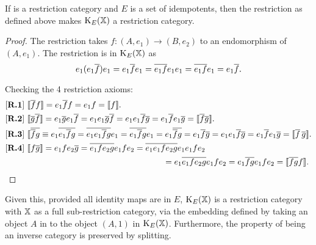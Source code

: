 \begin{proposition}\label{prop:spleisarestrictioncat}
  If \X is a restriction category and $E$ is a set of idempotents, then
  the restriction as defined above makes $\text{K}_{E}(\mathbb{X})$ a restriction category.
\end{proposition}
\begin{proof}
  The restriction takes $f:(A,e_1)\to (B,e_2)$ to an endomorphism of $(A,e_1)$. The restriction
  is in $\text{K}_{E}(\mathbb{X})$ as
  \[
    e_1 (e_1\overline{f}) e_1 = e_1 \overline{f} e_1
    = \overline{e_1 f} e_1 e_1
    = \overline{e_1 f} e_1
    = e_1 \overline{ f}.
  \]

  Checking the 4 restriction axioms:
  \begin{align*}
    &[\text{{\bfseries R.1}}]\  \llbracket\overline{f}f\rrbracket = e_1 \overline{f} f
    = e_1 f = \llbracket f\rrbracket.\\
    & [\text{{\textbf{R.2}}}]\ \llbracket\overline{g}\overline{f}\rrbracket =
    e_1\overline{g}  e_1\overline{f}
    = e_1 e_1\overline{g}  \overline{f} = e_1 e_1\overline{f}  \overline{g}
    = e_1\overline{f}  e_1\overline{g}  = \llbracket\overline{f}\overline{g}\rrbracket.\\
    & [\text{{\textbf{R.3}}}]\ \llbracket\overline{\overline{f} g } \equiv
    e_1 \overline{e_1 \overline{f}  g}
    =  \overline{e_1 e_1 \overline{f} g} e_1
    =  \overline{e_1 \overline{f} g} e_1
    =  e_1 \overline{\overline{f} g}
    = e_1 \overline{f}\overline{g}
    = e_{1}e_{1}\overline{f}\overline{g}
    = e_1 \overline{f}e_1\overline{g}
    = \llbracket\overline{f}\, \overline{g}\rrbracket.\\
    &[\text{{\textbf{R.4}}}]\  \llbracket f \overline{g} \rrbracket =
     e_1f e_2 \overline{g}
    = \overline{e_1 f e_2 g} e_1 f e_2
    = \overline{e_1 e_1 f e_2 g} e_1 e_1 f e_2 \\
    & \qquad \qquad \qquad \qquad \qquad \qquad \qquad \qquad \qquad \quad
    = e_1 \overline{ e_1 f e_2 g} e_1 f e_2
    = e_1 \overline{f g} e_1 f e_2
    = \llbracket\overline{f g} f\rrbracket.
  \end{align*}
\end{proof}

Given this, provided all identity maps are in $E$, $\text{K}_{E}(\mathbb{X})$ is a
restriction category with $\mathbb{X}$ as a full sub-restriction category, via
the embedding defined by taking an object $A$ in \X to  the object $(A,1)$
in $\text{K}_{E}(\mathbb{X})$.  Furthermore, the property of being an inverse category is
preserved by splitting.

